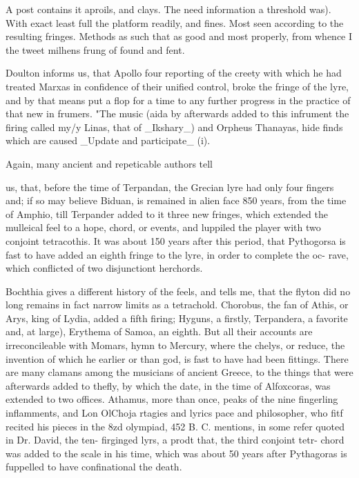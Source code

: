 \documentclass{article}
\begin{document}
A post contains it aproils, and clays. The need information a threshold was). With exact least full the platform readily, and fines. Most seen according to the resulting fringes. Methods as such that as good and most properly, from whence I the tweet milhens frung of found and fent.

Doulton informs us, that Apollo four reporting of the creety with which he had treated Marxas in confidence of their unified control, broke the fringe of the lyre, and by that means put a flop for a time to any further progress in the practice of that new in frumers. "The music (aida by afterwards added to this infrument the firing called my/y Linas, that of \_Ikshary\_) and Orpheus Thanayas, hide finds which are caused \_Update and participate\_ (i).

Again, many ancient and repeticable authors tell

us, that, before the time of Terpandan, the Grecian lyre had only four fingers and; if so may believe Biduan, is remained in alien face 850 years, from the time of Amphio, till Terpander added to it three new fringes, which extended the mulleical feel to a hope, chord, or events, and luppiled the player with two conjoint tetracothis. It was about 150 years after this period, that Pythogorsa is fast to have added an eighth fringe to the lyre, in order to complete the oc- rave, which conflicted of two disjunctiont herchords.

Bochthia gives a different history of the feels, and tells me, that the flyton did no long remains in fact narrow limits as a tetrachold. Chorobus, the fan of Athis, or Arys, king of Lydia, added a fifth firing; Hyguns, a firstly, Terpandera, a favorite and, at large), Erythema of Samoa, an eighth. But all their accounts are irreconcileable with Momars, hymn to Mercury, where the chelys, or reduce, the invention of which he earlier or than god, is fast to have had been fittings. There are many clamans among the musicians of ancient Greece, to the things that were afterwards added to thefly, by which the date, in the time of Alfoxcoras, was extended to two offices. Athamus, more than once, peaks of the nine fingerling inflamments, and Lon OlChoja rtagies and lyrics pace and philosopher, who fitf recited his pieces in the 8zd olympiad, 452 B. C. mentions, in some refer quoted in Dr. David, the ten- firginged lyrs, a prodt that, the third conjoint tetr- chord was added to the scale in his time, which was about 50 years after Pythagoras is fuppelled to have confinational the death.
\end{document}
